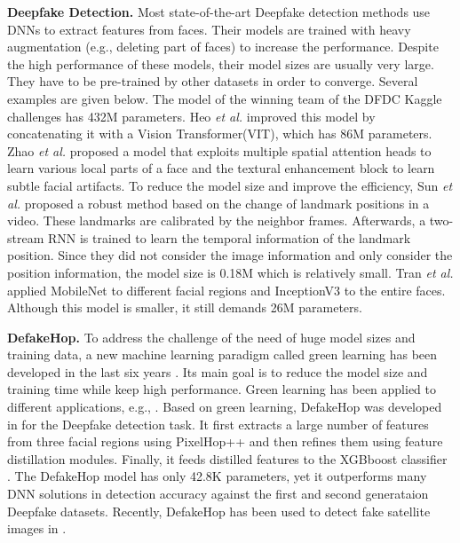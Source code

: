 \documentclass[main, biber]{now-journal}
\begin{document}
{\bf Deepfake Detection.} Most state-of-the-art Deepfake detection
methods use DNNs to extract features from faces. Their models are
trained with heavy augmentation (e.g., deleting part of faces) to
increase the performance.  Despite the high performance of these models,
their model sizes are usually very large. They have to be pre-trained by
other datasets in order to converge.  Several examples are given below.
The model of the winning team of the DFDC Kaggle challenges
\citep{seferbekov2020dfdc} has 432M parameters. Heo {\em et al.}
\citep{heo2021deepfake} improved this model by concatenating it with a
Vision Transformer(VIT), which has 86M parameters. Zhao {\em et al.}
\citep{zhao2021multi} proposed a model that exploits multiple spatial
attention heads to learn various local parts of a face and the textural
enhancement block to learn subtle facial artifacts.  To reduce the model
size and improve the efficiency, Sun {\em et al.}
\citep{sun2021improving} proposed a robust method based on the change of
landmark positions in a video. These landmarks are calibrated by the
neighbor frames. Afterwards, a two-stream RNN is trained to learn the
temporal information of the landmark position.  Since they did not
consider the image information and only consider the position
information, the model size is 0.18M which is relatively small.  Tran
{\em et al.} \citep{tran2021high} applied MobileNet to different facial
regions and InceptionV3 to the entire faces. Although this model is
smaller, it still demands 26M parameters. 

{\bf DefakeHop.} To address the challenge of the need of huge model
sizes and training data, a new machine learning paradigm called green
learning has been developed in the last six years
\citep{kuo2016understanding, kuo2019interpretable, chen2019pixelhop,
chen2020pixelhop++}. Its main goal is to reduce the model size and
training time while keep high performance. Green learning has been
applied to different applications, e.g., \citep{liu2021voxelhop,
monajatipoor2021berthop, zhang2021anomalyhop, rouhsedaghat2021low,
rouhsedaghat2021facehop, zhang2020unsupervised, kadam2021r,
zhang2020pointhop, zhang2020pointhop++}. Based on green learning,
DefakeHop was developed in \citep{chen2021defakehop} for the Deepfake
detection task.  It first extracts a large number of features from three
facial regions using PixelHop++ \citep{chen2019pixelhop} and then
refines them using feature distillation modules. Finally, it feeds
distilled features to the XGBboost classifier \citep{chen2016xgboost}.
The DefakeHop model has only 42.8K parameters, yet it outperforms many
DNN solutions in detection accuracy against the first and second
generataion Deepfake datasets. Recently, DefakeHop has been used
to detect fake satellite images in \citep{chen2021geo}.
\end{document}
